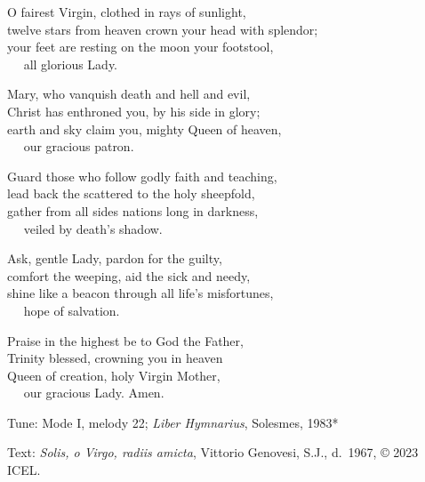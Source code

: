 \hymn

\settowidth{\versewidth}{twelve stars from heaven crown your head with splendor;}

\begin{hymnverse}[\versewidth]
O fairest Virgin, clothed in rays of sunlight,\\
twelve stars from heaven crown your head with splendor;\\
your feet are resting on the moon your footstool,\\
   all glorious Lady.

Mary, who vanquish death and hell and evil,\\
Christ has enthroned you, by his side in glory;\\
earth and sky claim you, mighty Queen of heaven,\\
   our gracious patron.

Guard those who follow godly faith and teaching,\\
lead back the scattered to the holy sheepfold,\\
gather from all sides nations long in darkness,\\
   veiled by death’s shadow.

Ask, gentle Lady, pardon for the guilty,\\
comfort the weeping, aid the sick and needy,\\
shine like a beacon through all life’s misfortunes,\\
   hope of salvation.

Praise in the highest be to God the Father,\\
Trinity blessed, crowning you in heaven\\
Queen of creation, holy Virgin Mother,\\
   our gracious Lady. Amen.
\end{hymnverse}

\begin{hymnsource}
Tune: Mode I, melody 22; \emph{Liber Hymnarius}, Solesmes, 1983*

Text: \emph{Solis, o Virgo, radiis amicta}, Vittorio Genovesi, S.J., d.\ 1967, © 2023 ICEL.
\end{hymnsource}
